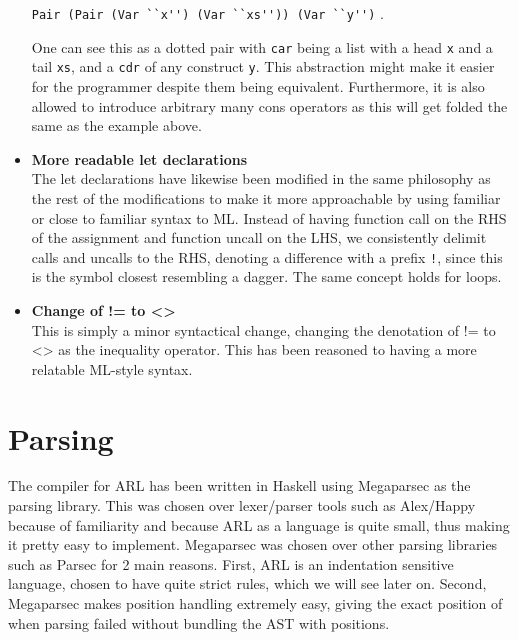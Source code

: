 \documentclass[a4paper]{article}
\begin{document}
\begin{itemize}
\verb+Pair (Pair (Var ``x'') (Var ``xs'')) (Var ``y'')+ .

One can see this as a dotted pair with \texttt{car} being a list with a head \texttt{x} and a tail \texttt{xs}, and a \texttt{cdr} of any construct \texttt{y}. This abstraction might make it easier for the programmer despite them being equivalent. Furthermore, it is also allowed to introduce arbitrary many cons operators as this will get folded the same as the example above.
\item \textbf{More readable let declarations}\\
The let declarations have likewise been modified in the same philosophy as the rest of the modifications to make it more approachable by using familiar or close to familiar syntax to ML. Instead of having function call on the RHS of the assignment and function uncall on the LHS, we consistently delimit calls and uncalls to the RHS, denoting a difference with a prefix \texttt{!}, since this is the symbol closest resembling a dagger. The same concept holds for loops.
\item \textbf{Change of != to <>}\\
This is simply a minor syntactical change, changing the denotation of != to <> as the inequality operator. This has been reasoned to having a more relatable ML-style syntax.
\end{itemize}
\section{Parsing}
\label{parsing}
The compiler for ARL has been written in Haskell using Megaparsec as the parsing library. This was chosen over lexer/parser tools such as Alex/Happy because of familiarity and because ARL as a language is quite small, thus making it pretty easy to implement. Megaparsec was chosen over other parsing libraries such as Parsec for 2 main reasons. First, ARL is an indentation sensitive language, chosen to have quite strict rules, which we will see later on. Second, Megaparsec makes position handling extremely easy, giving the exact position of when parsing failed without bundling the AST with positions.
\end{document}
